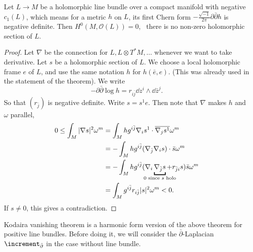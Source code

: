 \documentclass[12pt]{article}
\begin{document}
\begin{theorem}
  Let \(L\to M\) be a holomorphic line bundle over a compact manifold with
  negative \(c_1(L)\), which means for a metric \(h\) on \(L\), its first
  Chern form \(-\frac{\sqrt{-1}}{2\pi}\partial \bar{\partial}h\) is negative
  definite. Then \(H^0(M,\mathcal{O}(L))=0\), \ie\ there is no non-zero 
  holomorphic section of \(L\).
\end{theorem}
\begin{proof}
  Let \(\nabla\) be the connection for \(L,L\otimes T^*M,\ldots\) whenever
  we want to take derivative. Let \(s\) be a holomorphic section of \(L\).
  We choose a local holomorphic frame \(e\) of \(L\), and use the same notation
  \(h\) for \(h(\bar{e},e)\). (This was already used in the statement of the
  theorem). We write \[
    -\partial\bar{\partial}\log h=r_{i\bar{j}}\dd{z^i}\wedge \dd{\bar{z}^j}
  .\] So that \((r_{\bar{j}})\) is negative definite. Write \(s=s^1 e\). Then
  note that \(\nabla\) makes \(h\) and \(\omega\) parallel,
  \begin{align*}
    0\le \int_{M}|\nabla s|^2\omega^m&=\int_{M}hg^{i\bar{j}}\nabla_i s^1
    \cdot \overline{\nabla_j s^1}\omega^m \\
    &=-\int_{M}h g^{i\bar{j}}(\nabla_{\bar{j}}\nabla_i s)\cdot \bar{s}\omega^m \\
    &=-\int_{M}hg^{i\bar{j}}(\nabla_i\underbracket{\nabla_{\bar{j}}s}_
    {\mathclap{0\text{ since }s\text{ holo}}}+r_{\bar{j}i}s)\bar{s}\omega^m \\
    &=\int_{M}g^{i\bar{j}}r_{i\bar{j}}|s|^2\omega^m<0
  .\end{align*}
  If \(s\neq 0\), this gives a contradiction.
\end{proof}

Kodaira vanishing theorem is a harmonic form version of the above theorem for
positive line bundles. Before doing it, we will consider the \(\bar{\partial}
\)-Laplacian \(\lap_{\bar{\partial}}\) in the case without line bundle.
\end{document}
